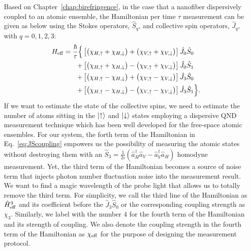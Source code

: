 Based on Chapter~\ref{chap:birefringence}, in the case that a nanofiber dispersively coupled to an atomic ensemble, the Hamiltonian per time $ \tau $ measurement can be given as below using the Stokes operators, $\hat{S}_q $, and collective spin operators, $ \hat{J}_q $, with $ q=0,1,2,3 $:
\begin{align}
H_{\rm eff} 
=\frac{\hbar}{\tau} \Big\{ & \left[ \big( \chi_{H,\uparrow} + \chi_{H,\downarrow}\big) + \big(\chi_{V,\uparrow} + \chi_{V,\downarrow}\big) \right] \hat{J}_0 \hat{S}_0 \nonumber \\
+ & \left[ \big( \chi_{H, \uparrow} + \chi_{H,\downarrow}\big) - \big( \chi_{V,\uparrow} + \chi_{V,\downarrow} \big)\right]  \hat{J}_0 \hat{S}_1 \nonumber \\
+ & \left[ \big( \chi_{H,\uparrow} - \chi_{H,\downarrow}\big) + \big(\chi_{V,\uparrow} - \chi_{V,\downarrow} \big) \right] \hat{J}_3 \hat{S}_0 \nonumber \\
+ & \left[ \big( \chi_{H,\uparrow} - \chi_{H,\downarrow}\big) - \big(\chi_{V,\uparrow} - \chi_{V,\downarrow} \big) \right]  \hat{J}_3 \hat{S}_1\Big\}.\label{eq:JScoupling}
\end{align}
If we want to estimate the state of the collective 
spins, we need to estimate the number of atoms sitting in the $ \lvert{\uparrow}\rangle $ and $ \lvert{\downarrow}\rangle 
$ states employing a dispersive QND measurement technique which has been well developed for the 
free-space atomic ensembles. For our system, the forth term of the Hamiltonian in 
Eq.~\eqref{eq:JScoupling} empowers us the possibility of measuring the atomic states without 
destroying them with an $ \hat{S}_3=\frac{1}{2i}(\hat{a}_H^\dagger\hat{a}_V - 
\hat{a}_V^\dagger\hat{a}_H) $ homodyne measurement. Yet, the third term of the Hamiltonian becomes 
a source of noise term that injects photon number fluctuation noise into the measurement result. 
We want to find a magic wavelength of the probe light that allows us to totally remove the third term. 
For simplicity, we call the third line of the Hamiltonian as $ \hat{H}^3_{\rm eff} $ and its coefficient before the $ \hat{J}_3\hat{S}_0 $ or the corresponding coupling strength as $ \chi_3 $. 
Similarly, we label with the number $ 4 $ for the fourth term of the Hamiltonian and its strength of coupling. 
We also denote the coupling strength in the fourth term of the Hamiltonian as $ \chi_{\rm eff} $ for the purpose of designing the measurement protocol.

